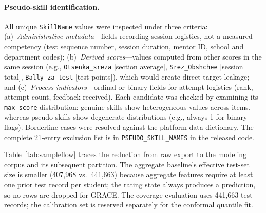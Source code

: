 \documentclass[11pt]{article}
\begin{document}
\paragraph{Pseudo-skill identification.}
All unique \texttt{SkillName} values were inspected under three criteria:
(a)~\textit{Administrative metadata}---fields recording session logistics, not a measured
competency (test sequence number, session duration, mentor ID, school and department codes);
(b)~\textit{Derived scores}---values computed from other scores in the same session
(e.g., \texttt{Otsenka\_sreza} [section average], \texttt{Srez\_Obshchee} [session total],
\texttt{Bally\_za\_test} [test points]),
which would create direct target leakage; and
(c)~\textit{Process indicators}---ordinal or binary fields for attempt logistics
(rank, attempt count, feedback received).
Each candidate was checked by examining its \texttt{max\_score} distribution: genuine
skills show heterogeneous values across items, whereas pseudo-skills show degenerate
distributions (e.g., always 1 for binary flags).
Borderline cases were resolved against the platform data dictionary.
The complete 21-entry exclusion list is in \texttt{PSEUDO\_SKILL\_NAMES} in the
released code.

Table~\ref{tab:sampleflow} traces the reduction from raw export to the modeling corpus
and its subsequent partition.
The aggregate baseline's effective test-set size is smaller (407,968 vs.\ 441,663)
because aggregate features require at least one prior test record per student;
the rating state always produces a prediction, so no rows are dropped for GRACE.
The coverage evaluation uses 441,663 test records; the calibration set is reserved
separately for the conformal quantile fit.
\end{document}

